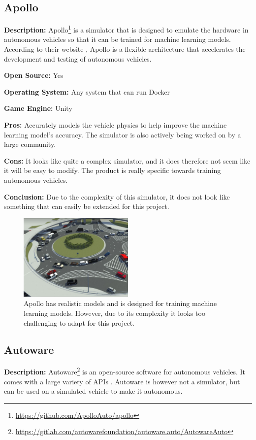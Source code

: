 \subsection{Apollo} \label{Apollo}
\textbf{Description:} Apollo\footnote{\url{https://github.com/ApolloAuto/apollo}} is a simulator that is designed to emulate the hardware in autonomous vehicles so that it can be trained for machine learning models. According to their website \cite{Apollo_Website}, Apollo is a flexible architecture that accelerates the development and testing of autonomous vehicles.

\textbf{Open Source:} Yes

\textbf{Operating System:} Any system that can run Docker

\textbf{Game Engine:} Unity

\textbf{Pros:} Accurately models the vehicle physics to help improve the machine learning model's accuracy. The simulator is also actively being worked on by a large community.  

\textbf{Cons:} It looks like quite a complex simulator, and it does therefore not seem like it will be easy to modify. The product is really specific towards training autonomous vehicles. 

\textbf{Conclusion:} Due to the complexity of this simulator, it does not look like something that can easily be extended for this project. 

\begin{figure}[H]
    \centering
    \includegraphics[width=0.5\textwidth]{03_Background/Appendix/Simulators/Apollo.JPG}
    \caption[Apollo]{Apollo has realistic models and is designed for training machine learning models. However, due to its complexity it looks too challenging to adapt for this project.}
\end{figure}

\subsection{Autoware} \label{Autoware}
\textbf{Description:} Autoware\footnote{\url{https://gitlab.com/autowarefoundation/autoware.auto/AutowareAuto}} is an open-source software for autonomous vehicles. It comes with a large variety of APIs  \cite{Autoware_doc_Website}. Autoware is however not a simulator, but can be used on a simulated vehicle to make it autonomous.

